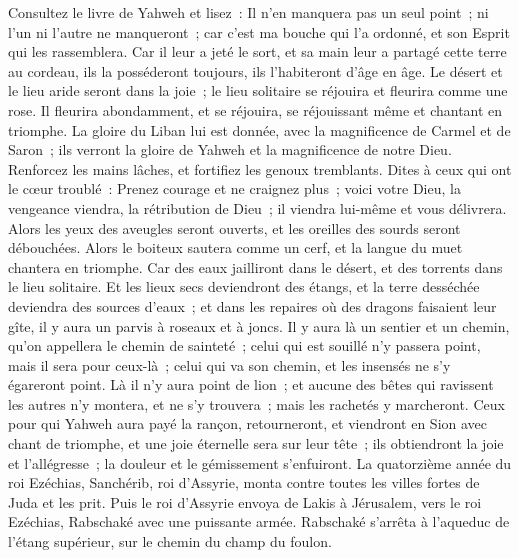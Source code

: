 \begin{multicols}{2}
Consultez le livre de Yahweh et lisez~: Il n'en manquera pas un seul point~; ni l'un ni l'autre ne manqueront~; car c'est ma bouche qui l'a ordonné, et son Esprit qui les rassemblera.
Car il leur a jeté le sort, et sa main leur a partagé cette terre au cordeau, ils la posséderont toujours, ils l'habiteront d'âge en âge.
\VerseOne{}Le désert et le lieu aride seront dans la joie~; le lieu solitaire se réjouira et fleurira comme une rose.
Il fleurira abondamment, et se réjouira, se réjouissant même et chantant en triomphe. La gloire du Liban lui est donnée, avec la magnificence de Carmel et de Saron~; ils verront la gloire de Yahweh et la magnificence de notre Dieu.
Renforcez les mains lâches, et fortifiez les genoux tremblants.
Dites à ceux qui ont le cœur troublé~: Prenez courage et ne craignez plus~; voici votre Dieu, la vengeance viendra, la rétribution de Dieu~; il viendra lui-même et vous délivrera.
Alors les yeux des aveugles seront ouverts, et les oreilles des sourds seront débouchées.
Alors le boiteux sautera comme un cerf, et la langue du muet chantera en triomphe. Car des eaux jailliront dans le désert, et des torrents dans le lieu solitaire.
Et les lieux secs deviendront des étangs, et la terre desséchée deviendra des sources d'eaux~; et dans les repaires où des dragons faisaient leur gîte, il y aura un parvis à roseaux et à joncs.
Il y aura là un sentier et un chemin, qu'on appellera le chemin de sainteté~; celui qui est souillé n'y passera point, mais il sera pour ceux-là~; celui qui va son chemin, et les insensés ne s'y égareront point.
Là il n'y aura point de lion~; et aucune des bêtes qui ravissent les autres n'y montera, et ne s'y trouvera~; mais les rachetés y marcheront.
Ceux pour qui Yahweh aura payé la rançon, retourneront, et viendront en Sion avec chant de triomphe, et une joie éternelle sera sur leur tête~; ils obtiendront la joie et l'allégresse~; la douleur et le gémissement s'enfuiront.
\VerseOne{}La quatorzième année du roi Ezéchias, Sanchérib, roi d'Assyrie, monta contre toutes les villes fortes de Juda et les prit.
Puis le roi d'Assyrie envoya de Lakis à Jérusalem, vers le roi Ezéchias, Rabschaké avec une puissante armée. Rabschaké s'arrêta à l'aqueduc de l'étang supérieur, sur le chemin du champ du foulon.

\end{multicols}
